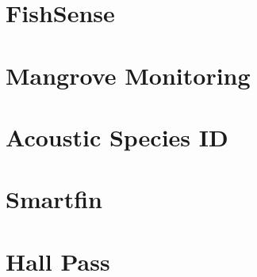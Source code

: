 \section{FishSense}

\section{Mangrove Monitoring}

\section{Acoustic Species ID}

\section{Smartfin}

\section{Hall Pass}


